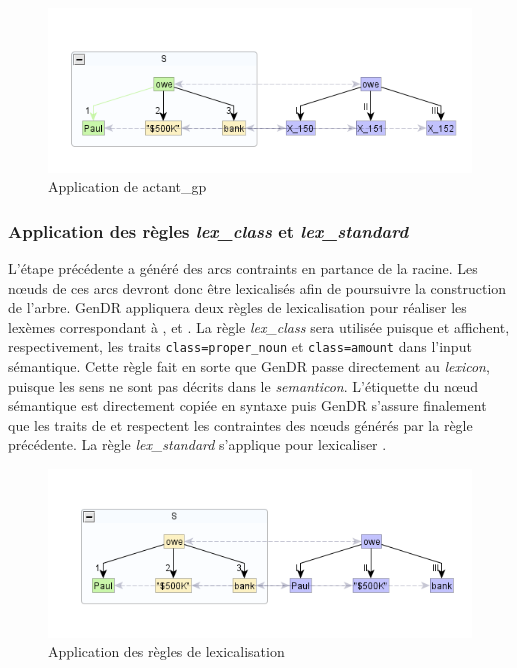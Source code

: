 \begin{figure}[htb]
	\centering
	\includegraphics[width=1\textwidth, trim = {0cm 8mm 0cm 15mm},clip]{ch3/figs/actant_gp1.png}
	\caption{Application de actant\_gp}
	\label{fig:actantgp}
\end{figure}

\subsubsection{Application des règles \emph{lex\_class} et \emph{lex\_standard}}

L'étape précédente a généré des arcs contraints en partance de la racine. Les n\oe{}uds de ces arcs devront donc être lexicalisés afin de poursuivre la construction de l'arbre. GenDR appliquera deux règles de lexicalisation pour réaliser les lexèmes correspondant à ,  et . La règle \emph{lex\_class} sera utilisée puisque  et  affichent, respectivement, les traits \texttt{class=proper\_noun} et \texttt{class=amount} dans l'input sémantique. Cette règle fait en sorte que GenDR passe directement au \emph{lexicon}, puisque les sens ne sont pas décrits dans le \emph{semanticon}. L'étiquette du n\oe{}ud sémantique est directement copiée en syntaxe puis GenDR s'assure finalement que les traits de  et  respectent les contraintes des n\oe{}uds générés par la règle précédente. La règle \emph{lex\_standard} s'applique pour lexicaliser .

\begin{figure}[htb]
	\centering
	\includegraphics[width=1\textwidth, trim = {0cm 8mm 0cm 10mm},clip]{ch3/figs/lex_standard2.png}
	\caption{Application des règles de lexicalisation}
	\label{fig:lexstand2}
\end{figure}

